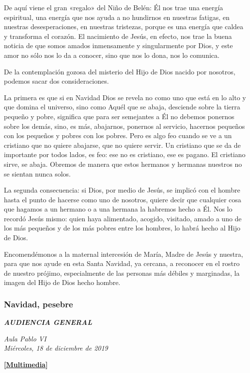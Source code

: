De aquí viene el gran «regalo» del Niño de Belén: Él nos trae una
energía espiritual, una energía que nos ayuda a no hundirnos en nuestras
fatigas, en nuestras desesperaciones, en nuestras tristezas, porque es
una energía que caldea y transforma el corazón. El nacimiento de Jesús,
en efecto, nos trae la buena noticia de que somos amados inmensamente y
singularmente por Dios, y este amor no sólo nos lo da a conocer, sino
que nos lo dona, nos lo comunica.

De la contemplación gozosa del misterio del Hijo de Dios nacido por
nosotros, podemos sacar dos consideraciones.

La primera es que si en Navidad Dios se revela no como uno que está en
lo alto y que domina el universo, sino como Aquél que se abaja,
desciende sobre la tierra pequeño y pobre, significa que para ser
semejantes a Él no debemos ponernos sobre los demás, sino, es más,
abajarnos, ponernos al servicio, hacernos pequeños con los pequeños y
pobres con los pobres. Pero es algo feo cuando se ve a un cristiano que
no quiere abajarse, que no quiere servir. Un cristiano que se da de
importante por todos lados, es feo: ese no es cristiano, ese es pagano.
El cristiano sirve, se abaja. Obremos de manera que estos hermanos y
hermanas nuestros no se sientan nunca solos.

La segunda consecuencia: si Dios, por medio de Jesús, se implicó con el
hombre hasta el punto de hacerse como uno de nosotros, quiere decir que
cualquier cosa que hagamos a un hermano o a una hermana la habremos
hecho a Él. Nos lo recordó Jesús mismo: quien haya alimentado, acogido,
visitado, amado a uno de los más pequeños y de los más pobres entre los
hombres, lo habrá hecho al Hijo de Dios.

Encomendémonos a la maternal intercesión de María, Madre de Jesús y
nuestra, para que nos ayude en esta Santa Navidad, ya cercana, a
reconocer en el rostro de nuestro prójimo, especialmente de las personas
más débiles y marginadas, la imagen del Hijo de Dios hecho hombre.

\subsubsection{Navidad, pesebre}
\emph{\textbf{AUDIENCIA GENERAL}}

\emph{Aula Pablo VI\\
	Miércoles, 18 de diciembre de 2019}

\textbf{{[}\href{http://w2.vatican.va/content/francesco/es/events/event.dir.html/content/vaticanevents/es/2019/12/18/udienzagenerale.html}{Multimedia}{]}}

